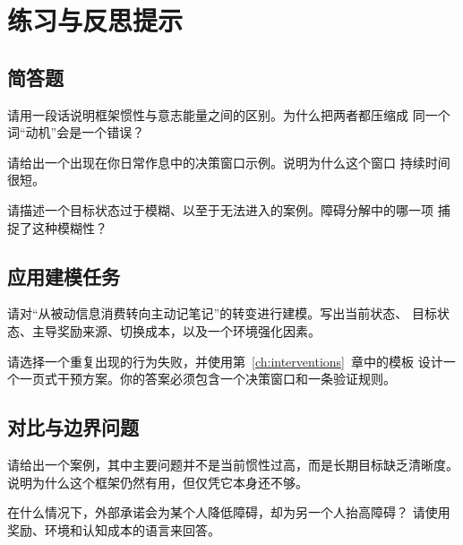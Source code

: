 \chapter{练习与反思提示}
\label{ch:exercises}

\section{简答题}

\begin{exercisebox}
\begin{exercise}
请用一段话说明框架惯性与意志能量之间的区别。为什么把两者都压缩成
同一个词“动机”会是一个错误？
\end{exercise}

\begin{exercise}
请给出一个出现在你日常作息中的决策窗口示例。说明为什么这个窗口
持续时间很短。
\end{exercise}

\begin{exercise}
请描述一个目标状态过于模糊、以至于无法进入的案例。障碍分解中的哪一项
捕捉了这种模糊性？
\end{exercise}
\end{exercisebox}

\section{应用建模任务}

\begin{exercisebox}
\begin{exercise}
请对“从被动信息消费转向主动记笔记”的转变进行建模。写出当前状态、
目标状态、主导奖励来源、切换成本，以及一个环境强化因素。
\end{exercise}

\begin{exercise}
请选择一个重复出现的行为失败，并使用第~\ref{ch:interventions}~章中的模板
设计一个一页式干预方案。你的答案必须包含一个决策窗口和一条验证规则。
\end{exercise}
\end{exercisebox}

\section{对比与边界问题}

\begin{exercisebox}
\begin{exercise}
请给出一个案例，其中主要问题并不是当前惯性过高，而是长期目标缺乏清晰度。
说明为什么这个框架仍然有用，但仅凭它本身还不够。
\end{exercise}

\begin{exercise}
在什么情况下，外部承诺会为某个人降低障碍，却为另一个人抬高障碍？
请使用奖励、环境和认知成本的语言来回答。
\end{exercise}
\end{exercisebox}

